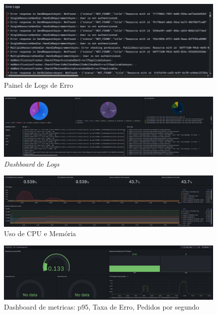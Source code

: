 \begin{figure}[H]
    \centering
    \includegraphics[width=1\textwidth]{images/Grafana/error_logs_dashboard.png}
    \caption{Painel de Logs de Erro}
\end{figure}

\begin{figure}[H]
    \centering
    \includegraphics[width=1\textwidth]{images/Grafana/dashboard.png}
    \caption{\textit{Dashboard} de \textit{Logs}}
\end{figure}

\begin{figure}[H]
    \centering
    \includegraphics[width=1\textwidth]{images/Grafana/cpu_memory_dashboard.png}
    \caption{Uso de CPU e Memória}
\end{figure}

\begin{figure}[H]
    \centering
    \includegraphics[width=1\textwidth]{images/Grafana/metrics_dashboard.png}
    \caption{Dashboard de metricas: p95, Taxa de Erro, Pedidos por segundo}
\end{figure}

